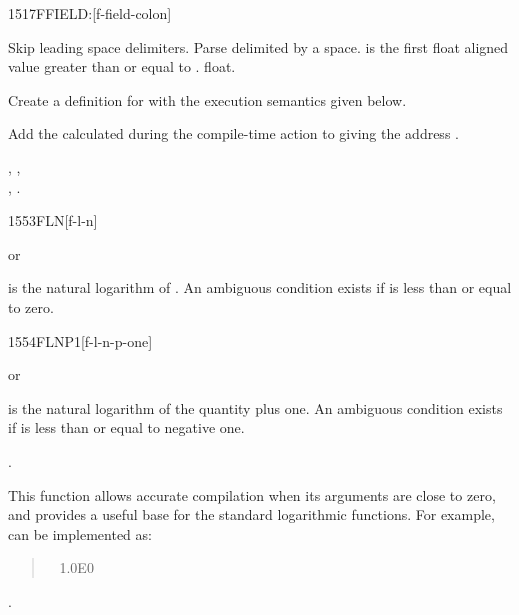 
\begin{worddef}{1517}{FFIELD:}[f-field-colon]
\item {}

	Skip leading space delimiters. Parse  delimited by
	a space.  is the first float aligned value greater
	than or equal to .   float.

	Create a definition for  with the execution semantics
	given below.

\execute[name]

	Add the  calculated during the compile-time action to
	 giving the address .

\see {},
	, \\
	,
	.
\end{worddef}


\begin{worddef}{1553}{FLN}[f-l-n]
\item {} or

	 is the natural logarithm of . An ambiguous
	condition exists if  is less than or equal to zero.
\end{worddef}


\begin{worddef}{1554}{FLNP1}[f-l-n-p-one]
\item {} or

	 is the natural logarithm of the quantity 
	plus one. An ambiguous condition exists if  is less
	than or equal to negative one.

\see {}.

	\begin{rationale} %
		This function allows accurate compilation when its arguments
		are close to zero, and provides a useful base for the standard
		logarithmic functions. For example,  can be
		implemented as:

		\begin{quote}\ttfamily
			\word[core]{:}  ~
				1.0E0  ~ 
			\word[core]{;}
		\end{quote}
	\see {}.
	\end{rationale}
\end{worddef}


